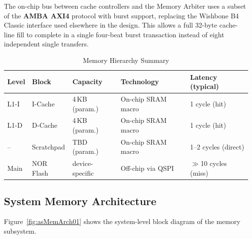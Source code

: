 The on-chip bus between cache controllers and the Memory Arbiter uses a
subset of the \textbf{AMBA AXI4} protocol with burst support, replacing the
Wishbone B4 Classic interface used elsewhere in the design.
This allows a full 32-byte cache-line fill to complete in a single
four-beat burst transaction instead of eight independent single transfers.

\begin{table}[H]
\caption{Memory Hierarchy Summary}
\label{tab:asMemHierarchy}
\centering
\begin{tabularx}{\textwidth}{|l |l |l |l |X|}
  \hline
  Level & Block & Capacity & Technology & Latency (typical) \\
  \hline
  \hline
  L1-I & I-Cache    & 4\,KB (param.)  & On-chip SRAM macro  & 1 cycle (hit) \\
  \hline
  L1-D & D-Cache    & 4\,KB (param.)  & On-chip SRAM macro  & 1 cycle (hit) \\
  \hline
  --   & Scratchpad & TBD (param.)    & On-chip SRAM macro  & 1--2 cycles (direct) \\
  \hline
  Main & NOR Flash  & device-specific & Off-chip via QSPI   & \(\gg\)10 cycles (miss) \\
  \hline
\end{tabularx}
\end{table}

\subsection{System Memory Architecture}

Figure~\ref{fig:asMemArch01} shows the system-level block diagram of the
memory subsystem.

